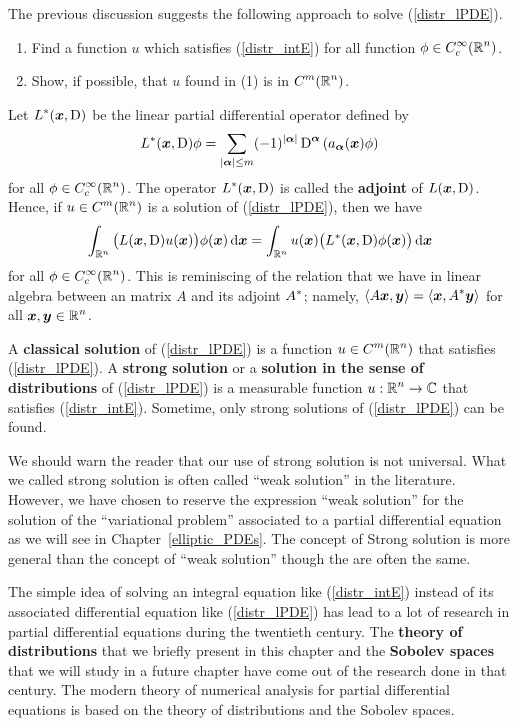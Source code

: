 The previous discussion suggests the following approach to solve
(\ref{distr_lPDE}).
\begin{enumerate}
\item Find a function $u$ which satisfies (\ref{distr_intE}) for all
function $\displaystyle \phi \in C_c^\infty(\mathbb{R}^n)$.
\item Show, if possible, that $u$ found in (1) is in
$\displaystyle C^m(\mathbb{R}^n)$.
\end{enumerate}

Let $\displaystyle L^\ast({\bm{x}}, \operatorname{D})$ be the linear partial
differential operator defined by
\[
L^\ast({\bm{x}}, \operatorname{D})\phi = \sum_{|{\bm{\alpha}}|\leq m} (-1)^{|{\bm{\alpha}}|}
\operatorname{D}^{{\bm{\alpha}}} \left( a_{{\bm{\alpha}}}({\bm{x}}) \phi \right)
\]
for all $\displaystyle \phi \in C_c^\infty(\mathbb{R}^n)$.  The
operator $\displaystyle L^\ast({\bm{x}}, \operatorname{D})$ is called the
{\bfseries adjoint} of
$L({\bm{x}}, \operatorname{D})$.  Hence, if $\displaystyle u \in C^m(\mathbb{R}^n)$ is a
solution of (\ref{distr_lPDE}), then we have
\[
\int_{\mathbb{R}^n} \big( L({\bm{x}}, \operatorname{D})u({\bm{x}}) \big) \phi({\bm{x}}) \,\mathrm{d}{{\bm{x}}}
= \int_{\mathbb{R}^n} u({\bm{x}}) \big( L^\ast({\bm{x}}, \operatorname{D})\phi({\bm{x}})
\big) \,\mathrm{d}{{\bm{x}}}
\]
for all $\displaystyle \phi \in C_c^\infty(\mathbb{R}^n)$.
This is reminiscing of the relation that we have in linear algebra between an
\nn matrix $A$ and its adjoint $\displaystyle A^\ast$; namely,
$\displaystyle \left\langle{A{\bm{x}}} , {{\bm{y}}}\right\rangle = \left\langle{{\bm{x}}} , {A^\ast{\bm{y}}}\right\rangle$
for all $\displaystyle {\bm{x}}, {\bm{y}} \in \mathbb{R}^n$.

A {\bfseries classical solution}
of (\ref{distr_lPDE}) is a function
$\displaystyle u\in C^m(\mathbb{R}^n)$ that satisfies (\ref{distr_lPDE}).
A {\bfseries strong solution} or a
{\bfseries solution in the sense of distributions} of (\ref{distr_lPDE}) is a measurable
function $\displaystyle u:\mathbb{R}^n \to \mathbb{C}$ that satisfies (\ref{distr_intE}).
Sometime, only strong solutions of (\ref{distr_lPDE}) can be found.

We should warn the reader that our use of strong solution is not
universal.  What we called strong solution is often called
``weak solution'' in the literature.   However, we have chosen to
reserve the expression ``weak solution'' for the solution of the
``variational problem'' associated to a partial differential equation
as we will see in Chapter~\ref{elliptic_PDEs}.  The concept of
Strong solution is more general than the concept of ``weak solution''
though the are often the same.

The simple idea of solving an integral equation like
(\ref{distr_intE}) instead of its associated differential equation
like (\ref{distr_lPDE}) has lead to a lot of research in partial
differential equations during the twentieth century.  The
{\bfseries theory of distributions} that we
briefly present in this chapter and the
{\bfseries Sobolev spaces} that we will
study in a future chapter have come out of the research done in
that century.  The modern theory of numerical analysis for partial
differential equations is based on the theory of distributions and the
Sobolev spaces.

